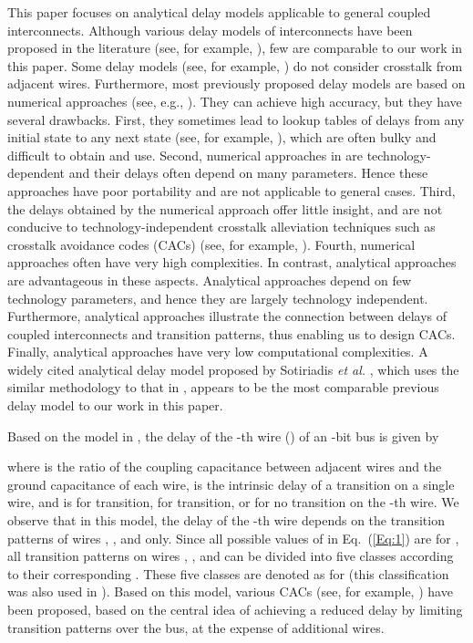 \documentclass[10pt,journal]{IEEEtran}
\begin{document}
This paper focuses on analytical delay models applicable to general coupled interconnects. Although various delay models of interconnects have been proposed in the literature (see, for example, \cite{Kay98,Pil98,Alp01,Sot01,Sot02,Liu02,Dav002,Abo02,Tu06,Mol09}), few are comparable to our work in this paper. Some delay models (see, for example, \cite{Kay98,Alp01,Liu02,Mol09,Pil98,Abo02}) do not consider crosstalk from adjacent wires. Furthermore, most previously proposed delay models are based on numerical approaches (see, e.g., \cite{Kay98,Alp01,Liu02,Dav002,Tu06,Mol09,Pil98,Abo02}). They can achieve high accuracy, but they have several drawbacks. First, they sometimes lead to lookup tables of delays from any initial state to any next state (see, for example, \cite{Mol09}), which are often bulky and difficult to obtain and use. Second, numerical approaches in \cite{Kay98,Pil98,Alp01,Liu02,Abo02} are technology-dependent and their delays often depend on many parameters. Hence these approaches have poor portability and are not applicable to general cases. Third, the delays obtained by the numerical approach offer little insight, and are not conducive to technology-independent crosstalk alleviation techniques such as crosstalk avoidance codes (CACs) (see, for example, \cite{Dua01,Vic01,Sri07,Wu09}). Fourth, numerical approaches often have very high complexities. In contrast, analytical approaches are advantageous in these aspects. Analytical approaches depend on few technology parameters, and hence they are largely technology independent. Furthermore, analytical approaches illustrate the connection between delays of coupled interconnects and transition patterns, thus enabling us to design CACs. Finally, analytical approaches have very low computational complexities.
A widely cited analytical delay model proposed by Sotiriadis \emph{et al.} \cite{Sot01,Sot02}, which uses the similar methodology to that in \cite{SC_TVLSI02}, appears to be the most comparable previous delay model to our work in this paper.



Based on the model in \cite{Sot01,Sot02}, the delay of the -th wire () of an -bit bus is given by

where  is the ratio of the coupling capacitance between
adjacent wires and the ground capacitance of each wire,
 is the intrinsic delay of a transition on a single wire,
and  is  for  transition,  for
 transition, or  for no transition on the -th
wire. We observe that in this model, the delay of the -th wire
depends on the transition patterns of wires , , and  only. Since all possible values of  in Eq.~(\ref{Eq:1}) are  for , all transition patterns on wires , , and  can be divided into five classes according to their corresponding . These five classes are denoted as  for  (this classification was also used in \cite{Dua01}). Based on this model, various CACs (see, for example,  \cite{Dua01,Vic01,Sri07,Wu09}) have been proposed, based on the central idea of achieving a reduced delay by limiting transition patterns over the bus, at the expense of additional wires.
\end{document}
